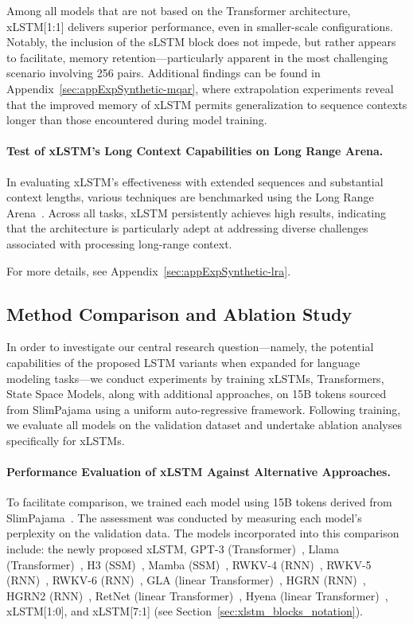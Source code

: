 Among all models that are not based on the Transformer architecture, xLSTM[1:1] delivers superior performance, even in smaller-scale configurations. Notably, the inclusion of the sLSTM block does not impede, but rather appears to facilitate, memory retention—particularly apparent in the most challenging scenario involving 256 pairs. Additional findings can be found in Appendix~\ref{sec:appExpSynthetic-mqar}, where extrapolation experiments reveal that the improved memory of xLSTM permits generalization to sequence contexts longer than those encountered during model training.

\paragraph{Test of xLSTM's Long Context Capabilities on Long Range Arena.} In evaluating xLSTM's effectiveness with extended sequences and substantial context lengths, various techniques are benchmarked using the Long Range Arena~\citep{Tay:21}. Across all tasks, xLSTM persistently achieves high results, indicating that the architecture is particularly adept at addressing diverse challenges associated with processing long-range context.

For more details, see Appendix~\ref{sec:appExpSynthetic-lra}.

\subsection{Method Comparison and Ablation Study}
\label{sec:ExpComparison}

In order to investigate our central research question—namely, the potential capabilities of the proposed LSTM variants when expanded for language modeling tasks—we conduct experiments by training xLSTMs, Transformers, State Space Models, along with additional approaches, on 15B tokens sourced from SlimPajama using a uniform auto-regressive framework. Following training, we evaluate all models on the validation dataset and undertake ablation analyses specifically for xLSTMs.

\paragraph{Performance Evaluation of xLSTM Against Alternative Approaches.} To facilitate comparison, we trained each model using 15B tokens derived from SlimPajama~\citep{Soboleva:23}. The assessment was conducted by measuring each model’s perplexity on the validation data. The models incorporated into this comparison include: the newly proposed xLSTM, GPT-3 (Transformer)~\citep{Brown:20short}, Llama (Transformer)~\citep{Touvron:23arxiv}, H3 (SSM)~\citep{Fu:23}, Mamba (SSM)~\citep{Gu:24arxiv}, RWKV-4 (RNN)~\citep{Peng:23arxivshort}, RWKV-5 (RNN)~\citep{Peng:24arxivshort}, RWKV-6 (RNN)~\citep{Peng:24arxivshort}, GLA (linear Transformer)~\citep{Yang:23arxiv}, HGRN (RNN)~\citep{Qin:23}, HGRN2 (RNN)~\citep{Qin:24arxiv}, RetNet (linear Transformer)~\citep{Sun:23arxiv}, Hyena (linear Transformer)~\citep{Poli:23}, xLSTM[1:0], and xLSTM[7:1] (see Section~\ref{sec:xlstm_blocks_notation}). 

